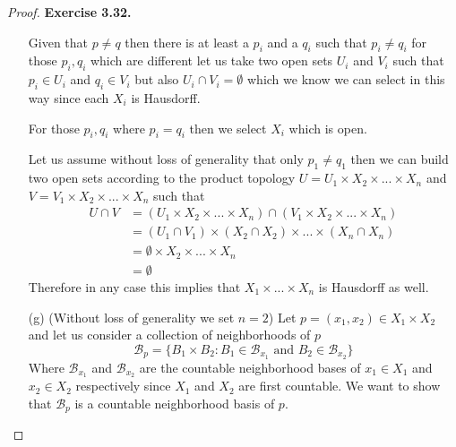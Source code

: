\documentclass[11pt]{article}
\theoremstyle{definition}
\begin{document}
\begin{proof}{\textbf{Exercise 3.32.}}
\begin{itemize}
    Given that $p \neq q$ then there is at least a $p_i$ and a $q_i$ such that
    $p_i \neq q_i$ for those $p_i, q_i$ which are different let us take
    two open sets $U_i$ and $V_i$ such that $p_i \in U_i$ and $q_i \in V_i$
    but also $U_i \cap V_i = \emptyset$ which we know we can select in this way
    since each $X_i$ is Hausdorff.

    For those $p_i, q_i$ where $p_i = q_i$ then we select $X_i$ which is open.

    Let us assume without loss of generality that only $p_1 \neq q_1$
    then we can build two open sets according to the product topology
    $U = U_1 \times X_2 \times ... \times X_n$ and
    $V = V_1 \times X_2 \times ... \times X_n$ such that
    \begin{align*}
        U \cap V &= (U_1 \times X_2 \times... \times X_n)
          \cap (V_1 \times X_2 \times ... \times X_n)\\
            &= (U_1 \cap V_1) \times (X_2 \cap X_2) \times 
            ... \times (X_n \cap X_n)\\
            &= \emptyset \times X_2 \times ... \times X_n\\
            &= \emptyset
    \end{align*}
    Therefore in any case this implies that $X_1 \times ... \times X_n$
    is Hausdorff as well.
    \item [(g)] (Without loss of generality we set $n=2$)
    Let $p = (x_1, x_2) \in X_1 \times X_2$ and
    let us consider a collection of neighborhoods of $p$ 
    $$\mathcal{B}_p = \{B_1 \times B_2: B_1 \in \mathcal{B}_{x_1}
    \text{ and } B_2 \in \mathcal{B}_{x_2}\}$$
    Where $\mathcal{B}_{x_1}$ and $\mathcal{B}_{x_2}$ are the countable
    neighborhood bases of $x_1 \in X_1$ and $x_2 \in X_2$ respectively
    since $X_1$ and $X_2$ are first countable.
    We want to show that $\mathcal{B}_p$ is a countable neighborhood basis of $p$.
    

\end{itemize}
\end{proof}
\end{document}

